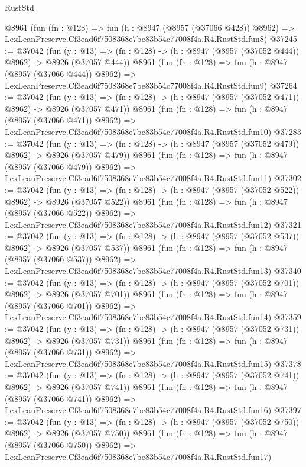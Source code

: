 \begin{lexlean}{RustStd}
\begin{coremodule}
    @8961
    (fun (fn : @128) =>
    fun (h : @8947 (@8957 (@37066 @428)) @8962) =>
    LexLeanPreserve.Cf3ead6f7508368e7be83b54c77008f4a.R4.RustStd.fun8)
@37245 := @37042
    (fun (y : @13) => (fn : @128) -> (h : @8947 (@8957 (@37052 @444)) @8962) -> @8926 (@37057 @444))
    @8961
    (fun (fn : @128) =>
    fun (h : @8947 (@8957 (@37066 @444)) @8962) =>
    LexLeanPreserve.Cf3ead6f7508368e7be83b54c77008f4a.R4.RustStd.fun9)
@37264 := @37042
    (fun (y : @13) => (fn : @128) -> (h : @8947 (@8957 (@37052 @471)) @8962) -> @8926 (@37057 @471))
    @8961
    (fun (fn : @128) =>
    fun (h : @8947 (@8957 (@37066 @471)) @8962) =>
    LexLeanPreserve.Cf3ead6f7508368e7be83b54c77008f4a.R4.RustStd.fun10)
@37283 := @37042
    (fun (y : @13) => (fn : @128) -> (h : @8947 (@8957 (@37052 @479)) @8962) -> @8926 (@37057 @479))
    @8961
    (fun (fn : @128) =>
    fun (h : @8947 (@8957 (@37066 @479)) @8962) =>
    LexLeanPreserve.Cf3ead6f7508368e7be83b54c77008f4a.R4.RustStd.fun11)
@37302 := @37042
    (fun (y : @13) => (fn : @128) -> (h : @8947 (@8957 (@37052 @522)) @8962) -> @8926 (@37057 @522))
    @8961
    (fun (fn : @128) =>
    fun (h : @8947 (@8957 (@37066 @522)) @8962) =>
    LexLeanPreserve.Cf3ead6f7508368e7be83b54c77008f4a.R4.RustStd.fun12)
@37321 := @37042
    (fun (y : @13) => (fn : @128) -> (h : @8947 (@8957 (@37052 @537)) @8962) -> @8926 (@37057 @537))
    @8961
    (fun (fn : @128) =>
    fun (h : @8947 (@8957 (@37066 @537)) @8962) =>
    LexLeanPreserve.Cf3ead6f7508368e7be83b54c77008f4a.R4.RustStd.fun13)
@37340 := @37042
    (fun (y : @13) => (fn : @128) -> (h : @8947 (@8957 (@37052 @701)) @8962) -> @8926 (@37057 @701))
    @8961
    (fun (fn : @128) =>
    fun (h : @8947 (@8957 (@37066 @701)) @8962) =>
    LexLeanPreserve.Cf3ead6f7508368e7be83b54c77008f4a.R4.RustStd.fun14)
@37359 := @37042
    (fun (y : @13) => (fn : @128) -> (h : @8947 (@8957 (@37052 @731)) @8962) -> @8926 (@37057 @731))
    @8961
    (fun (fn : @128) =>
    fun (h : @8947 (@8957 (@37066 @731)) @8962) =>
    LexLeanPreserve.Cf3ead6f7508368e7be83b54c77008f4a.R4.RustStd.fun15)
@37378 := @37042
    (fun (y : @13) => (fn : @128) -> (h : @8947 (@8957 (@37052 @741)) @8962) -> @8926 (@37057 @741))
    @8961
    (fun (fn : @128) =>
    fun (h : @8947 (@8957 (@37066 @741)) @8962) =>
    LexLeanPreserve.Cf3ead6f7508368e7be83b54c77008f4a.R4.RustStd.fun16)
@37397 := @37042
    (fun (y : @13) => (fn : @128) -> (h : @8947 (@8957 (@37052 @750)) @8962) -> @8926 (@37057 @750))
    @8961
    (fun (fn : @128) =>
    fun (h : @8947 (@8957 (@37066 @750)) @8962) =>
    LexLeanPreserve.Cf3ead6f7508368e7be83b54c77008f4a.R4.RustStd.fun17)

\end{coremodule}
\end{lexlean}
